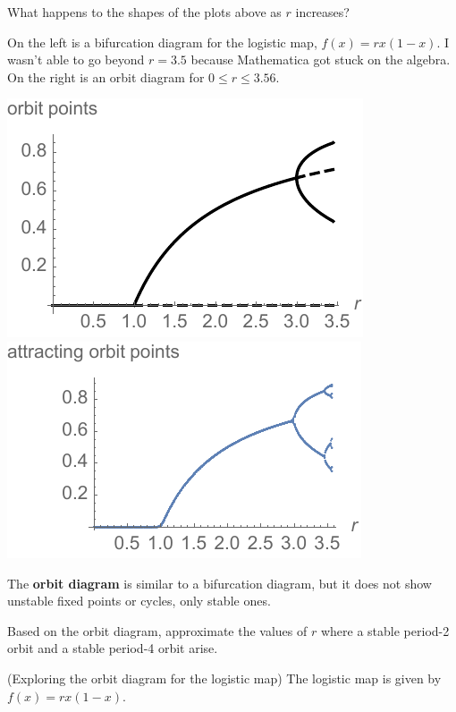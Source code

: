 \documentclass[12pt,letterpaper,noanswers]{exam}
\begin{document}
\begin{questions}
\begin{parts}
\item What happens to the shapes of the plots above as $r$ increases?

\item On the left is a bifurcation diagram for the logistic map, $f(x) = rx(1-x)$.  I wasn't able to go beyond $r = 3.5$ because Mathematica got stuck on the algebra.  On the right is an orbit diagram for $0\leq r \leq 3.56$.

\includegraphics{img/191105-C26p4.pdf}
\includegraphics{img/191105-C26p5.pdf}

The \textbf{orbit diagram} is similar to a bifurcation diagram, but it does not show unstable fixed points or cycles, only stable ones.

Based on the orbit diagram, approximate the values of $r$ where a stable period-2 orbit and a stable period-4 orbit arise.

\end{parts}

\question (Exploring the orbit diagram for the logistic map) The logistic map is given by $f(x) = rx(1-x)$.  

\end{questions}
\end{document}
